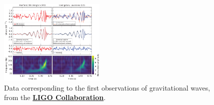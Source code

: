 \documentclass{article}
\begin{document}
\begin{figure}
\centering
\includegraphics[width=0.45\textwidth]{LIGO_data.png}
\caption{\label{fig:1} Data corresponding to the first observations of gravitational waves, from the \textbf{\href{https://journals.aps.org/prl/abstract/10.1103/PhysRevLett.116.061102}{LIGO Collaboration}}.}
\end{figure}
\end{document}
